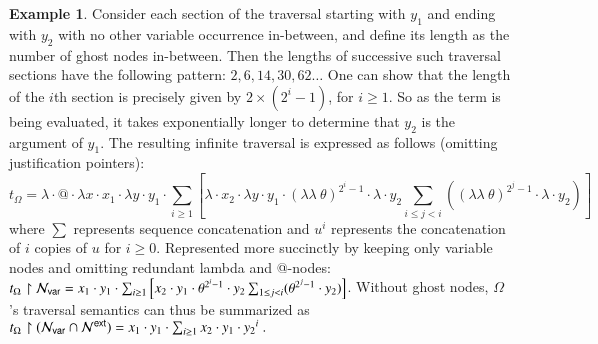 \documentclass{elsarticle}
\theoremstyle{plain}
\theoremstyle{definition}
\newtheorem{example}{Example}[section]
\theoremstyle{remark}
\newcommand\Nodes{\mathcal{N}}%
\newcommand\NodesVar{\Nodes_{\sf var}}%
\newcommand{\ghostlmd}{{\lambda\!\!\lambda}}
\newcommand{\ghostvar}{\theta}
\newcommand{\ExtNodes}{\Nodes^{\sf ext}}
\begin{document}
\begin{example}
    Consider each section of the traversal starting with $y_1$ and ending with $y_2$ with no other variable occurrence in-between, and define its length as the number of ghost nodes in-between. Then the lengths of successive such traversal sections have the following pattern: $2,6,14,30,62\ldots$
    One can show that the length of the $i$th section is precisely given by $2\times(2^i-1)$, for $i\geq1$.
    So as the term is being evaluated, it takes exponentially longer to determine that $y_2$ is the argument of $y_1$.
    The resulting infinite traversal is expressed as follows (omitting justification pointers):
    \begin{equation*}
    t_\Omega = \lambda \cdot @ \cdot \lambda x \cdot  x_1 \cdot \lambda y \cdot y_1
    \cdot  \sum_{i\geq 1}
        \left[
            \lambda \cdot x_2 \cdot \lambda y \cdot y_1 \cdot
             {(\ghostlmd\ \ghostvar)}^{2^i -1}\cdot \lambda \cdot y_2
                 \sum_{i\leq j<i}
                    \left(
                        {(\ghostlmd\ \ghostvar)}^{2^j -1}
                        \cdot
                        \lambda \cdot y_2
                    \right)
        \right]
    \end{equation*}
    where $\sum$ represents sequence concatenation and $u^i$ represents the concatenation of $i$ copies of $u$ for $i\geq 0$.
    Represented more succinctly by keeping only variable nodes and omitting redundant lambda and @-nodes:
    $t_\Omega \filter \NodesVar =  x_1 \cdot y_1
        \cdot  \sum_{i\geq 1}
            \left[
                x_2 \cdot y_1 \cdot
                 \ghostvar^{2^i -1}\cdot y_2
                     \sum_{1\leq j <i} (\ghostvar^{2^j -1} \cdot y_2)
            \right]
    $.
    Without ghost nodes, $\Omega$'s traversal semantics can thus be summarized as
    $
        t_\Omega \filter (\NodesVar\inter\ExtNodes) =  x_1 \cdot y_1
        \cdot  \sum_{i\geq 1} x_2 \cdot y_1 \cdot {y_2}^i \ .
    $
\end{example}
\end{document}
